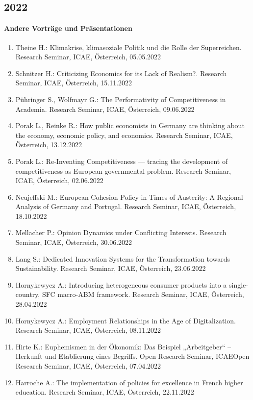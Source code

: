 \subsection*{2022}
\paragraph{Andere Vorträge und Präsentationen}
\begin{enumerate}
	\item Theine H.: Klimakrise, klimasoziale Politik und die Rolle der Superreichen. Research Seminar, ICAE, Österreich, 05.05.2022
	\item Schnitzer H.: Criticizing Economics for its Lack of Realism?. Research Seminar, ICAE, Österreich, 15.11.2022
	\item Pühringer S., Wolfmayr G.: The Performativity of Competitiveness in Academia. Research Seminar, ICAE, Österreich, 09.06.2022
	\item Porak L., Reinke R.: How public economists in Germany are thinking about the economy, economic policy, and economics. Research Seminar, ICAE, Österreich, 13.12.2022
	\item Porak L.: Re-Inventing Competitiveness — tracing the development of competitiveness as European governmental problem. Research Seminar, ICAE, Österreich, 02.06.2022
	\item Neujeffski M.: European Cohesion Policy in Times of Austerity: A Regional Analysis of Germany and Portugal. Research Seminar, ICAE, Österreich, 18.10.2022
	\item Mellacher P.: Opinion Dynamics under Conflicting Interests. Research Seminar, ICAE, Österreich, 30.06.2022
	\item Lang S.: Dedicated Innovation Systems for the Transformation towards Sustainability. Research Seminar, ICAE, Österreich, 23.06.2022
	\item Hornykewycz A.: Introducing heterogeneous consumer products into a single-country, SFC macro-ABM framework. Research Seminar, ICAE, Österreich, 28.04.2022
	\item Hornykewycz A.: Employment Relationships in the Age of Digitalization. Research Seminar, ICAE, Österreich, 08.11.2022
	\item Hirte K.: Euphemismen in der Ökonomik: Das Beispiel „Arbeitgeber“ – Herkunft und Etablierung eines Begriffs. Open Research Seminar, ICAEOpen Research Seminar, ICAE, Österreich, 07.04.2022
	\item Harroche A.: The implementation of policies for excellence in French higher education. Research Seminar, ICAE, Österreich, 22.11.2022

\end{enumerate}

